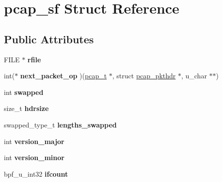 \hypertarget{structpcap__sf}{
\section{pcap\_\-sf Struct Reference}
\label{structpcap__sf}
}
\subsection*{Public Attributes}
\begin{DoxyCompactItemize}
\item 
\hypertarget{structpcap__sf_aeb18da4525c4d9d19bd0304e7c1ee5f5}{
FILE $\ast$ {\bfseries rfile}}
\label{structpcap__sf_aeb18da4525c4d9d19bd0304e7c1ee5f5}

\item 
\hypertarget{structpcap__sf_abe7707f47eaa30542759c3d0bfeb54c9}{
int($\ast$ {\bfseries next\_\-packet\_\-op} )(\hyperlink{structpcap}{pcap\_\-t} $\ast$, struct \hyperlink{structpcap__pkthdr}{pcap\_\-pkthdr} $\ast$, u\_\-char $\ast$$\ast$)}
\label{structpcap__sf_abe7707f47eaa30542759c3d0bfeb54c9}

\item 
\hypertarget{structpcap__sf_ae5de1541c2454a2506e3ba41c80ee708}{
int {\bfseries swapped}}
\label{structpcap__sf_ae5de1541c2454a2506e3ba41c80ee708}

\item 
\hypertarget{structpcap__sf_a356528ba0fa688ae8ba1128e7f3e01f8}{
size\_\-t {\bfseries hdrsize}}
\label{structpcap__sf_a356528ba0fa688ae8ba1128e7f3e01f8}

\item 
\hypertarget{structpcap__sf_a9d02cfbcb03aa94617c818f318bd367e}{
swapped\_\-type\_\-t {\bfseries lengths\_\-swapped}}
\label{structpcap__sf_a9d02cfbcb03aa94617c818f318bd367e}

\item 
\hypertarget{structpcap__sf_ac3b67e197ab39be6bc7124cafa243ddd}{
int {\bfseries version\_\-major}}
\label{structpcap__sf_ac3b67e197ab39be6bc7124cafa243ddd}

\item 
\hypertarget{structpcap__sf_a0df03c295a4aeb577ee757b860813f19}{
int {\bfseries version\_\-minor}}
\label{structpcap__sf_a0df03c295a4aeb577ee757b860813f19}

\item 
\hypertarget{structpcap__sf_a06134dffdf02c9e8eeabcf00720e28c9}{
bpf\_\-u\_\-int32 {\bfseries ifcount}}
\label{structpcap__sf_a06134dffdf02c9e8eeabcf00720e28c9}


\end{DoxyCompactItemize}
